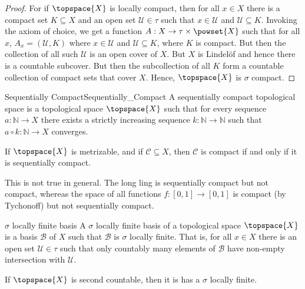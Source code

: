 \documentclass{article}                                                        %
\begin{document}
        \begin{proof}
            For if $\topspace{X}$ is locally compact, then for all $x\in{X}$
            there is a compact set $K\subseteq{X}$ and an open set
            $\mathcal{U}\in\tau$ such that $x\in\mathcal{U}$ and
            $\mathcal{U}\subseteq{K}$. Invoking the axiom of choice, we get a
            function $A:X\rightarrow\tau\times\powset{X}$ such that for all
            $x$, $A_{x}=(\mathcal{U},K)$ where $x\in\mathcal{U}$ and
            $\mathcal{U}\subseteq{K}$, where $K$ is compact. But then the
            collection of all such $\mathcal{U}$ is an open cover of $X$. But
            $X$ is Lindel\"{o}f and hence there is a countable subcover. But
            then the subcollection of all $K$ form a countable collection of
            compact sets that cover $X$. Hence, $\topspace{X}$ is $\sigma$
            compact.
        \end{proof}
        \begin{fdefinition}{Sequentially Compact}{Sequentially_Compact}
            A sequentially compact topological space is a topological space
            $\topspace{X}$ such that for every sequence
            $a:\mathbb{N}\rightarrow{X}$ there exists a strictly increasing
            sequence $k:\mathbb{N}\rightarrow\mathbb{N}$ such that
            $a\circ{k}:\mathbb{N}\rightarrow{X}$ converges.
        \end{fdefinition}
        \begin{theorem}
            If $\topspace{X}$ is metrizable, and if $\mathcal{C}\subseteq{X}$,
            then $\mathcal{C}$ is compact if and only if it is sequentially
            compact.
        \end{theorem}
        This is not true in general. The long ling is sequentially compact but
        not compact, whereas the space of all functions
        $f:[0,1]\rightarrow[0,1]$ is compact (by Tychonoff) but not sequentially
        compact.
        \begin{fdefinition}{$\sigma$ locally finite basis}
            A $\sigma$ locally finite basis of a topological space
            $\topspace{X}$ is a basis $\mathcal{B}$ of $X$ such that
            $\mathcal{B}$ is $\sigma$ locally finite. That is, for all $x\in{X}$
            there is an open set $\mathcal{U}\in\tau$ such that only countably
            many elements of $\mathcal{B}$ have non-empty intersection with
            $\mathcal{U}$.
        \end{fdefinition}
        \begin{theorem}
            \label{thm:Second_Countable_Implies_Sigma_Loc_Fin_Basis}%
            If $\topspace{X}$ is second countable, then it is has a $\sigma$
            locally finite.
        \end{theorem}
\end{document}
